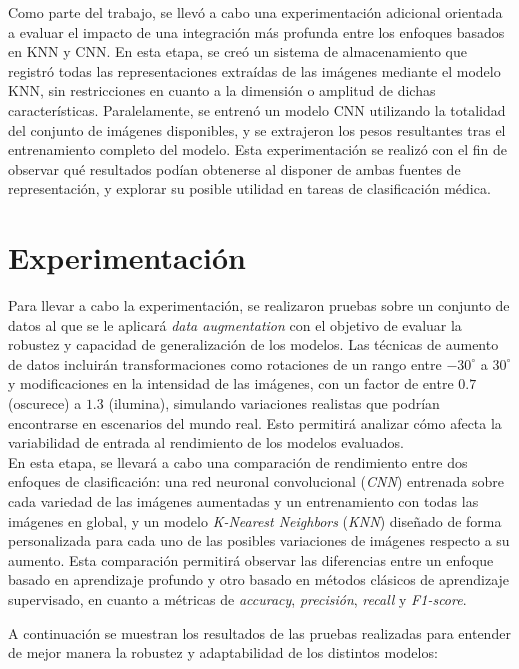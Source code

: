 \documentclass[12pt]{article} %
\begin{document}
Como parte del trabajo, se llevó a cabo una experimentación adicional orientada a evaluar el impacto de una integración más profunda entre los enfoques basados en KNN y CNN. En esta etapa, se creó un sistema de almacenamiento que registró todas las representaciones extraídas de las imágenes mediante el modelo KNN, sin restricciones en cuanto a la dimensión o amplitud de dichas características. Paralelamente, se entrenó un modelo CNN utilizando la totalidad del conjunto de imágenes disponibles, y se extrajeron los pesos resultantes tras el entrenamiento completo del modelo. Esta experimentación se realizó con el fin de observar qué resultados podían obtenerse al disponer de ambas fuentes de representación, y explorar su posible utilidad en tareas de clasificación médica. 

 

\section{Experimentación}
Para llevar a cabo la experimentación, se realizaron pruebas sobre un conjunto de datos al que se le aplicará \textit{data augmentation} con el objetivo de evaluar la robustez y capacidad de generalización de los modelos. Las técnicas de aumento de datos incluirán transformaciones como rotaciones de un rango entre $-30^\circ$ a $30^\circ$ y modificaciones en la intensidad de las imágenes, con un factor de entre $0.7$ (oscurece) a $1.3$ (ilumina), simulando variaciones realistas que podrían encontrarse en escenarios del mundo real. Esto permitirá analizar cómo afecta la variabilidad de entrada al rendimiento de los modelos evaluados. \\

En esta etapa, se llevará a cabo una comparación de rendimiento entre dos enfoques de clasificación: una red neuronal convolucional (\textit{CNN}) entrenada sobre cada variedad de las imágenes aumentadas y un entrenamiento con todas las imágenes en global, y un modelo \textit{K-Nearest Neighbors} (\textit{KNN}) diseñado de forma personalizada para cada uno de las posibles variaciones de imágenes respecto a su aumento. Esta comparación permitirá observar las diferencias entre un enfoque basado en aprendizaje profundo y otro basado en métodos clásicos de aprendizaje supervisado, en cuanto a métricas de \textit{accuracy}, \textit{precisión}, \textit{recall} y \textit{F1-score}.

A continuación se muestran los resultados de las pruebas realizadas para entender de mejor manera la robustez y adaptabilidad de los distintos modelos:
\end{document}
